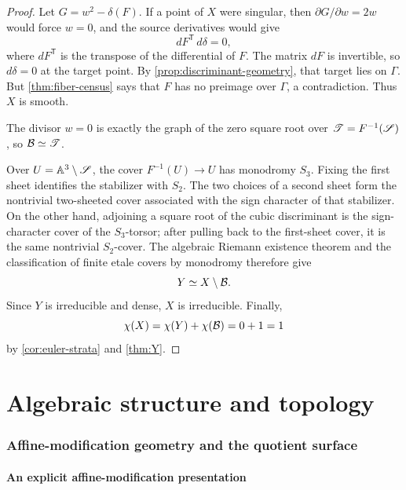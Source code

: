 \begin{proof}
Let $G=w^2-\delta(F)$.  If a point of $X$ were singular, then $\partial G/\partial w=2w$ would force $w=0$, and the source derivatives would give
\[
  dF^{\mathsf T}\,d\delta=0,
\]
where $dF^{\mathsf T}$ is the transpose of the differential of $F$.
The matrix $dF$ is invertible, so $d\delta=0$ at the target point.  By \cref{prop:discriminant-geometry}, that target lies on $\Gamma$.  But \cref{thm:fiber-census} says that $F$ has no preimage over $\Gamma$, a contradiction.  Thus $X$ is smooth.

The divisor $w=0$ is exactly the graph of the zero square root over $\mathscr T=F^{-1}(\mathscr S)$, so $\mathcal B\simeq\mathscr T$.

Over $U=\mathbb A^3\setminus\mathscr S$, the cover $F^{-1}(U)\to U$ has monodromy $S_3$.  Fixing the first sheet identifies the stabilizer with $S_2$.  The two choices of a second sheet form the nontrivial two-sheeted cover associated with the sign character of that stabilizer.  On the other hand, adjoining a square root of the cubic discriminant is the sign-character cover of the $S_3$-torsor; after pulling back to the first-sheet cover, it is the same nontrivial $S_2$-cover.  The algebraic Riemann existence theorem and the classification of finite etale covers by monodromy \cite[Expose XII]{SGA1} therefore give
\[
  Y\simeq X\setminus\mathcal B.
\]
Since $Y$ is irreducible and dense, $X$ is irreducible.  Finally,
\[
  \chi(X)=\chi(Y)+\chi(\mathcal B)=0+1=1
\]
by \cref{cor:euler-strata} and \cref{thm:Y}.
\end{proof}

\part{Algebraic structure and topology}\label{part:structure}
\section{Affine-modification geometry and the quotient surface}\label{sec:structure}

\subsection{An explicit affine-modification presentation}

